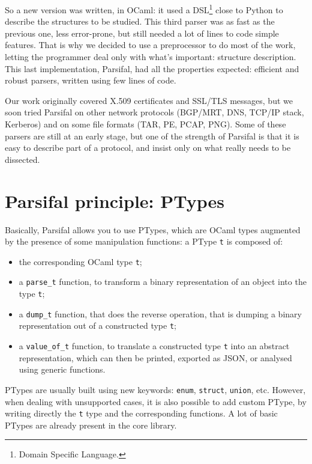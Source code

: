 \documentclass{article}
\begin{document}
So a new version was written, in OCaml: it used a DSL\footnote{Domain
  Specific Language.} close to Python to describe the structures
to be studied. This third parser was as fast as the previous one, less
error-prone, but still needed a lot of lines to code simple
features. That is why we decided to use a preprocessor to do most of
the work, letting the programmer deal only with what's important:
structure description. This last implementation, Parsifal, had all the
properties expected: efficient and robust parsers, written using few
lines of code.

Our work originally covered X.509 certificates and SSL/TLS messages,
but we soon tried Parsifal on other network protocols (BGP/MRT, DNS,
TCP/IP stack, Kerberos) and on some file formats (TAR, PE, PCAP,
PNG). Some of these parsers are still at an early stage, but one of
the strength of Parsifal is that it is easy to describe part of a
protocol, and insist only on what really needs to be dissected.



\section{Parsifal principle: PTypes}

Basically, Parsifal allows you to use PTypes, which are OCaml types
augmented by the presence of some manipulation functions: a PType
\texttt{t} is composed of:
\begin{itemize}
\item the corresponding OCaml type \texttt{t};
\item a \texttt{parse\_t} function, to transform a binary
  representation of an object into the type \texttt{t};
\item a \texttt{dump\_t} function, that does the reverse operation,
  that is dumping a binary representation out of a constructed type
  \texttt{t};
\item a \texttt{value\_of\_t} function, to translate a constructed
  type \texttt{t} into an abstract representation, which can then be
  printed, exported as JSON, or analysed using generic functions.
\end{itemize}

PTypes are usually built using new keywords: \texttt{enum},
\texttt{struct}, \texttt{union}, etc. However, when dealing with
unsupported cases, it is also possible to add custom PType, by writing
directly the \texttt{t} type and the corresponding functions. A lot of
basic PTypes are already present in the core library.
\end{document}
